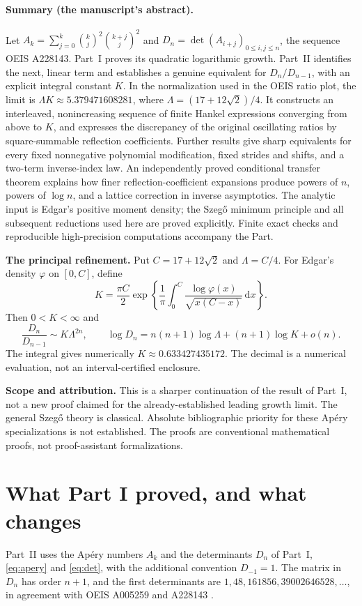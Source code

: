 \documentclass[11pt,a4paper]{article}
\numberwithin{equation}{section}
\theoremstyle{remark}\newtheorem{remark}[theorem]{Remark}
\newcommand{\dd}{\,\mathrm d}
\newcommand{\Lam}{\Lambda}
\begin{document}
\paragraph{Summary (the manuscript's abstract).}
Let $A_k=\sum_{j=0}^k\binom{k}{j}^2\binom{k+j}{j}^2$ and
$D_n=\det(A_{i+j})_{0\leq i,j\leq n}$, the sequence OEIS A228143.
Part~I proves its quadratic logarithmic growth.
Part~II identifies the next, linear term and establishes a genuine equivalent for
$D_n/D_{n-1}$, with an explicit integral constant $K$.
In the normalization used in the OEIS ratio plot, the limit is
$\Lam K\approx5.379471608281$, where $\Lam=(17+12\sqrt2)/4$.
It constructs an interleaved, nonincreasing sequence of finite Hankel expressions
converging from above to $K$, and expresses the discrepancy of the original
oscillating ratios by square-summable reflection coefficients.
Further results give sharp equivalents for every fixed nonnegative polynomial
modification, fixed strides and shifts, and a two-term inverse-index law.
An independently proved conditional transfer theorem explains how finer
reflection-coefficient expansions produce powers of $n$, powers of $\log n$,
and a lattice correction in inverse asymptotics.
The analytic input is Edgar's positive moment density; the Szeg\H{o} minimum
principle and all subsequent reductions used here are proved explicitly.
Finite exact checks and reproducible high-precision computations accompany
the Part.

\begin{resultbox}
\textbf{The principal refinement.} Put $C=17+12\sqrt2$ and $\Lam=C/4$.
For Edgar's density $\varphi$ on $[0,C]$, define
\[
 K=\frac{\pi C}{2}\exp\!\left\{
 \frac1\pi\int_0^C\frac{\log\varphi(x)}{\sqrt{x(C-x)}}\dd x\right\}.
\]
Then $0<K<\infty$ and
\[
 \frac{D_n}{D_{n-1}}\sim K\Lam^{2n},\qquad
 \log D_n=n(n+1)\log\Lam+(n+1)\log K+o(n).
\]
The integral gives numerically $K\approx0.633427435172$.
The decimal is a numerical evaluation, not an interval-certified enclosure.
\end{resultbox}

\noindent\textbf{Scope and attribution.}
This is a sharper continuation of the result of Part~I, not a new
proof claimed for the already-established leading growth limit.
The general Szeg\H{o} theory is classical. Absolute bibliographic priority for
these Ap\'ery specializations is not established. The proofs are conventional
mathematical proofs, not proof-assistant formalizations.

\section{What Part I proved, and what changes}
\label{szego:sec:target}
Part~II uses the Ap\'ery numbers $A_k$ and the determinants $D_n$ of
Part~I, \eqref{eq:apery} and \eqref{eq:det}, with the additional convention
$D_{-1}=1$. The matrix in $D_n$ has order $n+1$, and the first determinants
are $1,48,161856,39002646528,\ldots$, in agreement with OEIS A005259 and
A228143 \cite{oeis-apery,oeis-hankel}.
\end{document}

